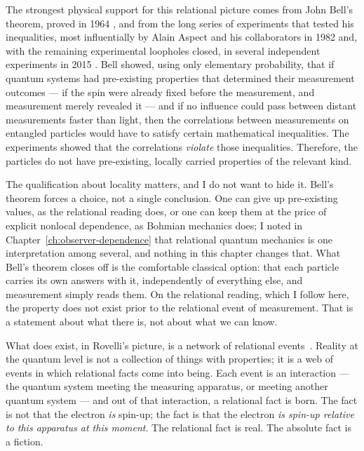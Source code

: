 The strongest physical support for this relational picture comes from John Bell's theorem, proved in 1964 \citep{Bell1964}, and from the long series of experiments that tested his inequalities, most influentially by Alain Aspect and his collaborators in 1982 \citep{Aspect1982} and, with the remaining experimental loopholes closed, in several independent experiments in 2015 \citep{Zeilinger2023Nobel}. Bell showed, using only elementary probability, that if quantum systems had pre-existing properties that determined their measurement outcomes --- if the spin were already fixed before the measurement, and measurement merely revealed it --- and if no influence could pass between distant measurements faster than light, then the correlations between measurements on entangled particles would have to satisfy certain mathematical inequalities. The experiments showed that the correlations \emph{violate} those inequalities. Therefore, the particles do not have pre-existing, locally carried properties of the relevant kind.

The qualification about locality matters, and I do not want to hide it. Bell's theorem forces a choice, not a single conclusion. One can give up pre-existing values, as the relational reading does, or one can keep them at the price of explicit nonlocal dependence, as Bohmian mechanics does; I noted in Chapter~\ref{ch:observer-dependence} that relational quantum mechanics is one interpretation among several, and nothing in this chapter changes that. What Bell's theorem closes off is the comfortable classical option: that each particle carries its own answers with it, independently of everything else, and measurement simply reads them. On the relational reading, which I follow here, the property does not exist prior to the relational event of measurement. That is a statement about what there is, not about what we can know.

What does exist, in Rovelli's picture, is a network of relational events~\citep{Rovelli2021}. Reality at the quantum level is not a collection of things with properties; it is a web of events in which relational facts come into being. Each event is an interaction --- the quantum system meeting the measuring apparatus, or meeting another quantum system --- and out of that interaction, a relational fact is born. The fact is not that the electron \emph{is} spin-up; the fact is that the electron \emph{is spin-up relative to this apparatus at this moment}. The relational fact is real. The absolute fact is a fiction.


